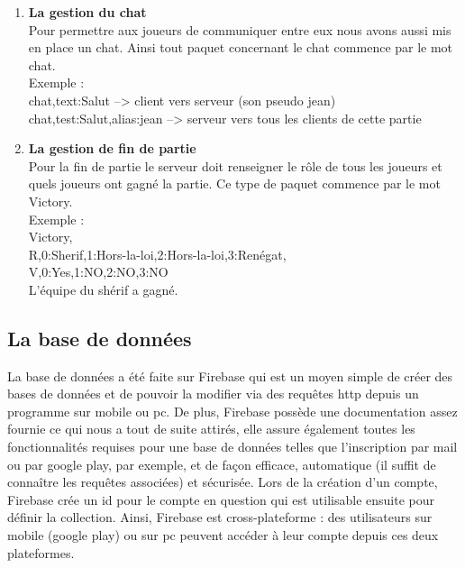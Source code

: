 \documentclass[a4paper,11pt]{article}
\begin{document}
\begin{enumerate}
	

	
	\item  \textbf{La gestion du chat} \\
	Pour permettre aux joueurs de communiquer entre eux nous avons aussi mis en place un chat. Ainsi tout paquet concernant le chat commence par le mot chat. \\


Exemple : \\

chat,text:Salut    --> client vers serveur (son pseudo jean) \\
chat,test:Salut,alias:jean --> serveur vers tous les clients de cette partie \\

	
 
	
	\item  \textbf{La gestion de fin de partie} \\
	Pour la fin de partie le serveur doit renseigner le rôle de tous les joueurs et quels joueurs ont gagné la partie. Ce type de paquet commence par le mot Victory. \\

Exemple : \\

Victory, \\
R,0:Sherif,1:Hors-la-loi,2:Hors-la-loi,3:Renégat, \\
V,0:Yes,1:NO,2:NO,3:NO \\

L’équipe du shérif a gagné. \\

	
\end{enumerate}


\subsection{La base de données} 


	La base de données a été faite sur Firebase qui est un moyen simple de créer des bases de données et de pouvoir la modifier via des requêtes http depuis un programme sur mobile ou pc. De plus, Firebase possède une documentation assez fournie ce qui nous a tout de suite attirés, elle  assure également toutes les fonctionnalités requises pour une base de données telles que l’inscription par mail ou par google play, par exemple, et de façon efficace, automatique (il suffit de connaître les requêtes associées) et sécurisée. Lors de la création d’un compte, Firebase crée un id pour le compte en question qui est utilisable ensuite pour définir la collection. Ainsi, Firebase est cross-plateforme : des utilisateurs sur mobile (google play) ou sur pc peuvent accéder à leur compte depuis ces deux plateformes. \\
\end{document}
